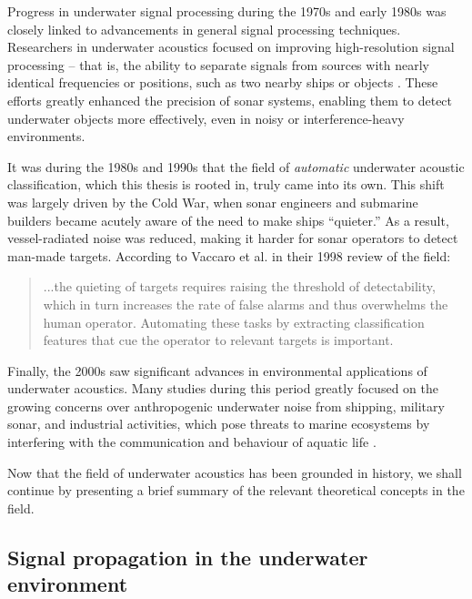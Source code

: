 Progress in underwater signal processing during the 1970s and early 1980s was closely linked to advancements in general signal processing techniques. Researchers in underwater acoustics focused on improving high-resolution signal processing -- that is, the ability to separate signals from sources with nearly identical frequencies or positions, such as two nearby ships or objects \cite{vaccaro_past_1998}. These efforts greatly enhanced the precision of sonar systems, enabling them to detect underwater objects more effectively, even in noisy or interference-heavy environments.

It was during the 1980s and 1990s that the field of \textit{automatic} underwater acoustic classification, which this thesis is rooted in, truly came into its own. This shift was largely driven by the Cold War, when sonar engineers and submarine builders became acutely aware of the need to make ships ``quieter.'' As a result, vessel-radiated noise was reduced, making it harder for sonar operators to detect man-made targets. According to Vaccaro et al. in their 1998 review of the field:

\begin{quote}
    ...the quieting of targets requires raising the threshold of detectability, which in turn increases the rate of false alarms and thus overwhelms the human operator. Automating these tasks by extracting classification features that cue the operator to relevant targets is important. \cite[46]{vaccaro_past_1998}
\end{quote}

Finally, the 2000s saw significant advances in environmental applications of underwater acoustics. Many studies during this period greatly focused on the growing concerns over anthropogenic underwater noise from shipping, military sonar, and industrial activities, which pose threats to marine ecosystems by interfering with the communication and behaviour of aquatic life \cite{erbe_underwater_2002, slabbekoorn_noisy_2010, wysocki_diversity_2007}.

Now that the field of underwater acoustics has been grounded in history, we shall continue by presenting a brief summary of the relevant theoretical concepts in the field.


\subsection{Signal propagation in the underwater environment}\label{subsec:sig-prop-uw-env}

